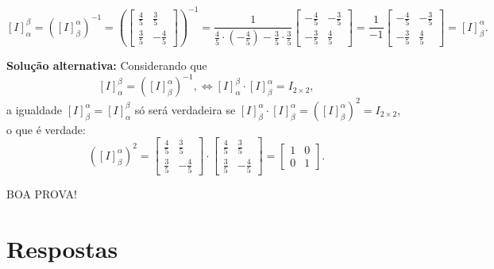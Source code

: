 \documentclass[12pt,a4paper]{article}
\begin{document}
\begin{ExerciseList}
\begin{enumerate}
\[[I]_{\alpha}^{\beta}
= \left([I]_{\beta}^{\alpha}\right)^{-1}
= \left(
\begin{bmatrix}
\frac{4}{5} & \frac{3}{5} \\
\frac{3}{5} & -\frac{4}{5}
\end{bmatrix}
\right)^{-1}
=
\frac{1}{\frac{4}{5} \cdot \left(-\frac{4}{5}\right) - \frac{3}{5} \cdot \frac{3}{5}}
\begin{bmatrix}
-\frac{4}{5} & -\frac{3}{5} \\
-\frac{3}{5} & \frac{4}{5}
\end{bmatrix}
=
\frac{1}{-1}
\begin{bmatrix}
-\frac{4}{5} & -\frac{3}{5} \\
-\frac{3}{5} & \frac{4}{5}
\end{bmatrix}
=[I]_{\beta}^{\alpha}.
\]

\textbf{Solução alternativa:}
Considerando que
\[
[I]_{\alpha}^{\beta} = ([I]_{\beta}^{\alpha})^{-1},
\Leftrightarrow
[I]_{\alpha}^{\beta} \cdot [I]_{\beta}^{\alpha} = I_{2\times 2},
\]
a igualdade $[I]_{\beta}^{\alpha} = [I]_{\alpha}^{\beta}$ só será verdadeira se $[I]_{\beta}^{\alpha} \cdot [I]_{\beta}^{\alpha} = {([I]_{\beta}^{\alpha})}^2 = I_{2\times 2}$, o que é verdade:
\[
{([I]_{\beta}^{\alpha})}^2
=
\begin{bmatrix}
\frac{4}{5} & \frac{3}{5} \\
\frac{3}{5} & -\frac{4}{5}
\end{bmatrix}
\cdot
\begin{bmatrix}
\frac{4}{5} & \frac{3}{5} \\
\frac{3}{5} & -\frac{4}{5}
\end{bmatrix}
=
\begin{bmatrix}
1&0\\0&1
\end{bmatrix}.
\]
\end{enumerate}
\end{ExerciseList}

\vfill
\begin{center}
BOA PROVA!
\end{center}

\newpage
\restoregeometry
\section*{Respostas}
\shipoutAnswer
\end{document}
